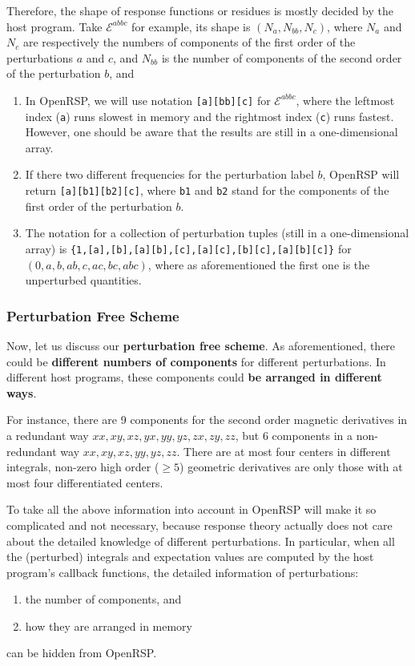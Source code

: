 \begin{description}
    Therefore, the shape of response functions or residues is mostly decided
    by the host program. Take $\mathcal{E}^{abbc}$ for example, its shape is
    $(N_{a},N_{bb},N_{c})$, where $N_{a}$ and $N_{c}$ are respectively the
    numbers of components of the first order of the perturbations $a$ and $c$,
    and $N_{bb}$ is the number of components of the second order of the
    perturbation $b$, and
    \begin{enumerate}
      \item In OpenRSP, we will use notation \texttt{[a][bb][c]} for
        $\mathcal{E}^{abbc}$, where the leftmost index (\texttt{a}) runs
        slowest in memory and the rightmost index (\texttt{c}) runs fastest.
        However, one should be aware that the results are still in a
        one-dimensional array.
      \item If there two different frequencies for the perturbation label
        $b$, OpenRSP will return \texttt{[a][b1][b2][c]}, where \texttt{b1}
        and \texttt{b2} stand for the components of the first order of the
        perturbation $b$.
      \item The notation for a collection of perturbation tuples (still in a
        one-dimensional array) is
        \texttt{\{1,[a],[b],[a][b],[c],[a][c],[b][c],[a][b][c]\}}
        for $(0,a,b,ab,c,ac,bc,abc)$, where as aforementioned the first one
        is the unperturbed quantities.
    \end{enumerate}
\end{description}

\subsubsection{Perturbation Free Scheme}

Now, let us discuss our \textbf{perturbation free scheme}. As aforementioned,
there could be \textbf{different numbers of components} for different
perturbations. In different host programs, these components could \textbf{be
arranged in different ways}.

For instance, there are 9 components for the second order magnetic derivatives
in a redundant way $xx,xy,xz,yx,yy,yz,zx,zy,zz$, but 6 components in a
non-redundant way $xx,xy,xz,yy,yz,zz$. There are at most four centers in
different integrals, non-zero high order ($\ge 5$) geometric derivatives are
only those with at most four differentiated centers.

To take all the above information into account in OpenRSP will make it so
complicated and not necessary, because response theory actually does not care
about the detailed knowledge of different perturbations. In particular, when
all the (perturbed) integrals and expectation values are computed by the host
program's callback functions, the detailed information of perturbations:
\begin{enumerate}
  \item the number of components, and
  \item how they are arranged in memory
\end{enumerate}
can be hidden from OpenRSP.

